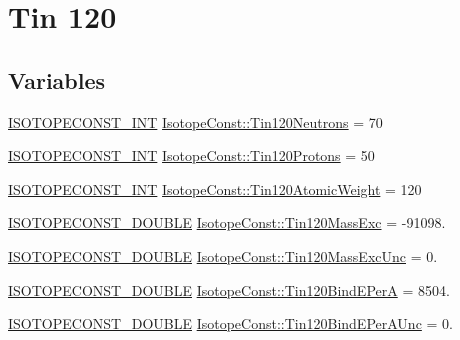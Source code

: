 \hypertarget{group___isotope_const-_tin-_sn120}{}\section{Tin 120}
\label{group___isotope_const-_tin-_sn120}
\subsection*{Variables}
\begin{DoxyCompactItemize}
\item 
\mbox{\hyperlink{group___isotope_const-_macros_ga5f18360b3e99483a35c32d789e62621c}{I\+S\+O\+T\+O\+P\+E\+C\+O\+N\+S\+T\+\_\+\+I\+NT}} \mbox{\hyperlink{group___isotope_const-_tin-_sn120_ga36d9ff5de2eb9184aceeff30debefafb}{Isotope\+Const\+::\+Tin120\+Neutrons}} = 70
\item 
\mbox{\hyperlink{group___isotope_const-_macros_ga5f18360b3e99483a35c32d789e62621c}{I\+S\+O\+T\+O\+P\+E\+C\+O\+N\+S\+T\+\_\+\+I\+NT}} \mbox{\hyperlink{group___isotope_const-_tin-_sn120_ga727db86d9316a1e7d84bfd7e0e42b088}{Isotope\+Const\+::\+Tin120\+Protons}} = 50
\item 
\mbox{\hyperlink{group___isotope_const-_macros_ga5f18360b3e99483a35c32d789e62621c}{I\+S\+O\+T\+O\+P\+E\+C\+O\+N\+S\+T\+\_\+\+I\+NT}} \mbox{\hyperlink{group___isotope_const-_tin-_sn120_ga1bad6ae07e19f951b7f2f6da233f9e05}{Isotope\+Const\+::\+Tin120\+Atomic\+Weight}} = 120
\item 
\mbox{\hyperlink{group___isotope_const-_macros_ga8f45a7272ce02c0b4c65c44636ed719a}{I\+S\+O\+T\+O\+P\+E\+C\+O\+N\+S\+T\+\_\+\+D\+O\+U\+B\+LE}} \mbox{\hyperlink{group___isotope_const-_tin-_sn120_ga7fc28e824162ddb0c37c75c7b0a1dca5}{Isotope\+Const\+::\+Tin120\+Mass\+Exc}} = -\/91098.
\item 
\mbox{\hyperlink{group___isotope_const-_macros_ga8f45a7272ce02c0b4c65c44636ed719a}{I\+S\+O\+T\+O\+P\+E\+C\+O\+N\+S\+T\+\_\+\+D\+O\+U\+B\+LE}} \mbox{\hyperlink{group___isotope_const-_tin-_sn120_ga3a619c52223905068be133a5ba8a5cce}{Isotope\+Const\+::\+Tin120\+Mass\+Exc\+Unc}} = 0.
\item 
\mbox{\hyperlink{group___isotope_const-_macros_ga8f45a7272ce02c0b4c65c44636ed719a}{I\+S\+O\+T\+O\+P\+E\+C\+O\+N\+S\+T\+\_\+\+D\+O\+U\+B\+LE}} \mbox{\hyperlink{group___isotope_const-_tin-_sn120_ga3b04922921c9466462bdf2a3e77558d4}{Isotope\+Const\+::\+Tin120\+Bind\+E\+PerA}} = 8504.
\item 
\mbox{\hyperlink{group___isotope_const-_macros_ga8f45a7272ce02c0b4c65c44636ed719a}{I\+S\+O\+T\+O\+P\+E\+C\+O\+N\+S\+T\+\_\+\+D\+O\+U\+B\+LE}} \mbox{\hyperlink{group___isotope_const-_tin-_sn120_gadac62f776b6cc12be034b057d420a435}{Isotope\+Const\+::\+Tin120\+Bind\+E\+Per\+A\+Unc}} = 0.

\end{DoxyCompactItemize}
